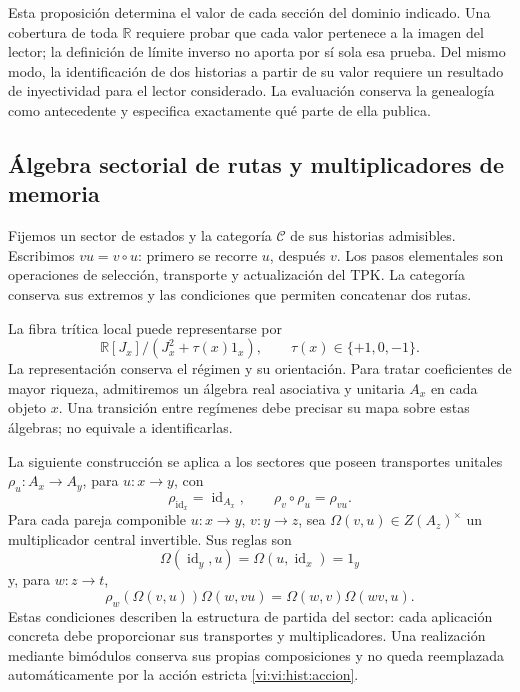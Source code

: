 Esta proposición determina el valor de cada sección del dominio indicado.
Una cobertura de toda \(\mathbb R\) requiere probar que cada valor
pertenece a la imagen del lector; la definición de límite inverso no
aporta por sí sola esa prueba. Del mismo modo, la identificación de dos
historias a partir de su valor requiere un resultado de inyectividad
para el lector considerado. La evaluación conserva la genealogía como
antecedente y especifica exactamente qué parte de ella publica.

\subsection{Álgebra sectorial de rutas y multiplicadores de memoria}
\label{vi:vi:hist:algebra}

Fijemos un sector de estados y la categoría \(\mathcal C\) de sus
historias admisibles. Escribimos \(vu=v\circ u\): primero se recorre
\(u\), después \(v\). Los pasos elementales son operaciones de
selección, transporte y actualización del TPK. La categoría conserva
sus extremos y las condiciones que permiten concatenar dos rutas.

La fibra trítica local puede representarse por
\[
 \mathbb R[J_x]/(J_x^2+\tau(x)1_x),
 \qquad \tau(x)\in\{+1,0,-1\}.
\]
La representación conserva el régimen y su orientación. Para tratar
coeficientes de mayor riqueza, admitiremos un álgebra real asociativa y
unitaria \(A_x\) en cada objeto \(x\). Una transición entre regímenes
debe precisar su mapa sobre estas álgebras; no equivale a identificarlas.

La siguiente construcción se aplica a los sectores que poseen transportes
unitales \(\rho_u:A_x\to A_y\), para \(u:x\to y\), con
\begin{equation}
 \rho_{\operatorname{id}_x}=\operatorname{id}_{A_x},\qquad
 \rho_v\circ\rho_u=\rho_{vu}.
 \label{vi:vi:hist:accion}
\end{equation}
Para cada pareja componible \(u:x\to y\), \(v:y\to z\), sea
\(\Omega(v,u)\in Z(A_z)^\times\) un multiplicador central invertible.
Sus reglas son
\begin{equation}
 \Omega(\operatorname{id}_y,u)
 =\Omega(u,\operatorname{id}_x)=1_y
 \label{vi:vi:hist:normalizacion}
\end{equation}
y, para \(w:z\to t\),
\begin{equation}
 \rho_w\!\left(\Omega(v,u)\right)\Omega(w,vu)
 =\Omega(w,v)\Omega(wv,u).
 \label{vi:vi:hist:cociclo}
\end{equation}
Estas condiciones describen la estructura de partida del sector: cada
aplicación concreta debe proporcionar sus transportes y multiplicadores.
Una realización mediante bimódulos conserva sus propias composiciones y
no queda reemplazada automáticamente por la acción estricta
\eqref{vi:vi:hist:accion}.

